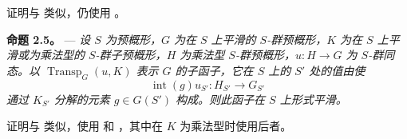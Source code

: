 证明与  类似，仍使用 。

\medskip\noindent{}\textbf{命题 2.5。} --- \textit{设 \(S\) 为预概形，\(G\) 为在 \(S\) 上平滑的 \(S\)-群预概形，\(K\) 为在 \(S\) 上平滑或为乘法型的 \(S\)-群子预概形，\(H\) 为乘法型 \(S\)-群预概形，\(u:H\to G\) 为 \(S\)-群同态。以 \(\operatorname{Transp}_G(u,K)\) 表示 \(G\) 的子函子，它在 \(S\) 上的 \(S'\) 处的值由使}  \[
  \operatorname{int}(g)u_{S'}:
  H_{S'}\longrightarrow G_{S'}
\]\textit{通过 \(K_{S'}\) 分解的元素 \(g\in G(S')\) 构成。则此函子在 \(S\) 上形式平滑。}

证明与  类似，使用  和 ，其中在 \(K\) 为乘法型时使用后者。


